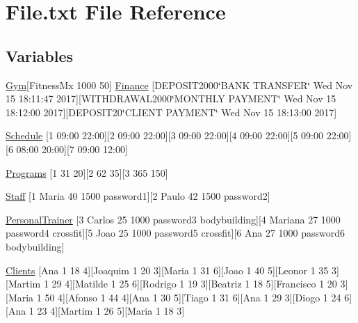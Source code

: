 \hypertarget{File_8txt}{}\section{File.\+txt File Reference}
\label{File_8txt}
\subsection*{Variables}
\begin{DoxyCompactItemize}
\item 
\hyperlink{classGym}{Gym}\mbox{[}Fitness\+Mx 1000 50\mbox{]} \hyperlink{File_8txt_a4d8a5d84ce8d74c2e12ef31b160e54b1}{Finance} \mbox{[}D\+E\+P\+O\+S\+I\+T2000\char`\"{}B\+A\+NK T\+R\+A\+N\+S\+F\+ER\char`\"{} \textquotesingle{}Wed Nov 15 18\+:11\+:47 2017\textquotesingle{}\mbox{]}\mbox{[}W\+I\+T\+H\+D\+R\+A\+W\+A\+L2000\char`\"{}M\+O\+N\+T\+H\+LY P\+A\+Y\+M\+E\+NT\char`\"{} \textquotesingle{}Wed Nov 15 18\+:12\+:00 2017\textquotesingle{}\mbox{]}\mbox{[}D\+E\+P\+O\+S\+I\+T20\char`\"{}C\+L\+I\+E\+NT P\+A\+Y\+M\+E\+NT\char`\"{} \textquotesingle{}Wed Nov 15 18\+:13\+:00 2017\textquotesingle{}\mbox{]}
\item 
\hyperlink{File_8txt_a061a3989efe937642aa9d1dc75313167}{Schedule} \mbox{[}1 09\+:00 22\+:00\mbox{]}\mbox{[}2 09\+:00 22\+:00\mbox{]}\mbox{[}3 09\+:00 22\+:00\mbox{]}\mbox{[}4 09\+:00 22\+:00\mbox{]}\mbox{[}5 09\+:00 22\+:00\mbox{]}\mbox{[}6 08\+:00 20\+:00\mbox{]}\mbox{[}7 09\+:00 12\+:00\mbox{]}
\item 
\hyperlink{File_8txt_a079e4f76d2da3f02f43dfd6e67359bf7}{Programs} \mbox{[}1 31 20\mbox{]}\mbox{[}2 62 35\mbox{]}\mbox{[}3 365 150\mbox{]}
\item 
\hyperlink{File_8txt_ace2bec253417dd04567d51f2f7a892f0}{Staff} \mbox{[}1 Maria 40 1500 password1\mbox{]}\mbox{[}2 Paulo 42 1500 password2\mbox{]}
\item 
\hyperlink{File_8txt_a8aa9f45f51f1850059c6a3d9af92d5fd}{Personal\+Trainer} \mbox{[}3 Carlos 25 1000 password3 bodybuilding\mbox{]}\mbox{[}4 Mariana 27 1000 password4 crossfit\mbox{]}\mbox{[}5 Joao 25 1000 password5 crossfit\mbox{]}\mbox{[}6 Ana 27 1000 password6 bodybuilding\mbox{]}
\item 
\hyperlink{File_8txt_ab53c6b8a41aeef0c40b64d3d2c428a6b}{Clients} \mbox{[}Ana 1 18 4\mbox{]}\mbox{[}Joaquim 1 20 3\mbox{]}\mbox{[}Maria 1 31 6\mbox{]}\mbox{[}Joao 1 40 5\mbox{]}\mbox{[}Leonor 1 35 3\mbox{]}\mbox{[}Martim 1 29 4\mbox{]}\mbox{[}Matilde 1 25 6\mbox{]}\mbox{[}Rodrigo 1 19 3\mbox{]}\mbox{[}Beatriz 1 18 5\mbox{]}\mbox{[}Francisco 1 20 3\mbox{]}\mbox{[}Maria 1 50 4\mbox{]}\mbox{[}Afonso 1 44 4\mbox{]}\mbox{[}Ana 1 30 5\mbox{]}\mbox{[}Tiago 1 31 6\mbox{]}\mbox{[}Ana 1 29 3\mbox{]}\mbox{[}Diogo 1 24 6\mbox{]}\mbox{[}Ana 1 23 4\mbox{]}\mbox{[}Martim 1 26 5\mbox{]}\mbox{[}Maria 1 18 3\mbox{]}
\end{DoxyCompactItemize}


